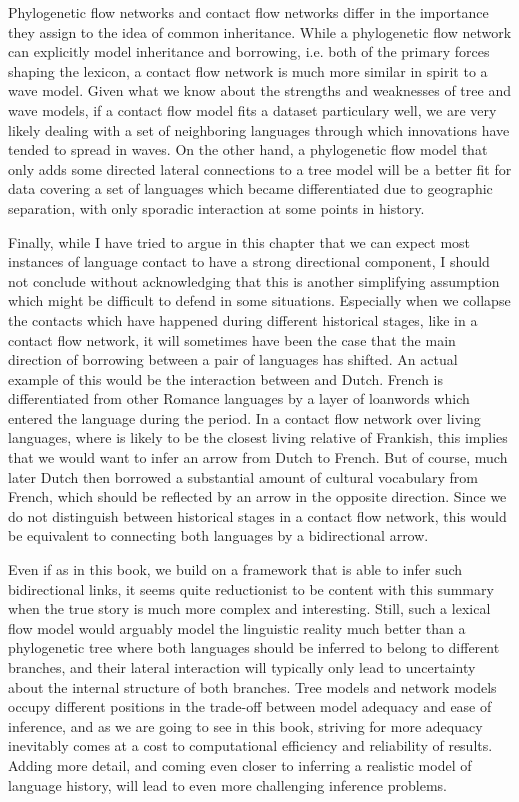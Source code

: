 Phylogenetic flow networks and contact flow networks differ in the importance they assign to the idea of common inheritance. While a phylogenetic flow network can explicitly model inheritance and borrowing, i.e. both of the primary forces shaping the lexicon, a contact flow network is much more similar in spirit to a wave model. Given what we know about the strengths and weaknesses of tree and wave models, if a contact flow model fits a dataset particulary well, we are very likely dealing with a set of neighboring languages through which innovations have tended to spread in waves. On the other hand, a phylogenetic flow model that only adds some directed lateral connections to a tree model will be a better fit for data covering a set of languages which became differentiated due to geographic separation, with only sporadic interaction at some points in history.

Finally, while I have tried to argue in this chapter that we can expect most instances of language contact to have a strong directional component, I should not conclude without acknowledging that this is another simplifying assumption which might be difficult to defend in some situations. Especially when we collapse the contacts which have happened during different historical stages, like in a contact flow network, it will sometimes have been the case that the main direction of borrowing between a pair of languages has shifted. An actual example of this would be the interaction between  and Dutch. French is differentiated from other Romance languages by a layer of  loanwords which entered the language during the  period. In a contact flow network over living languages, where  is likely to be the closest living relative of Frankish, this implies that we would want to infer an arrow from Dutch to French. But of course, much later Dutch then borrowed a substantial amount of cultural vocabulary from French, which should be reflected by an arrow in the opposite direction. Since we do not distinguish between historical stages in a contact flow network, this would be equivalent to connecting both languages by a bidirectional arrow.

Even if as in this book, we build on a framework that is able to infer such bidirectional links, it seems quite reductionist to be content with this summary when the true story is much more complex and interesting. Still, such a lexical flow model would arguably model the linguistic reality much better than a phylogenetic tree where both languages should be inferred to belong to different branches, and their lateral interaction will typically only lead to uncertainty about the internal structure of both branches. Tree models and network models occupy different positions in the trade-off between model adequacy and ease of inference, and as we are going to see in this book, striving for more adequacy inevitably comes at a cost to computational efficiency and reliability of results. Adding more detail, and coming even closer to inferring a realistic model of language history, will lead to even more challenging inference problems.

